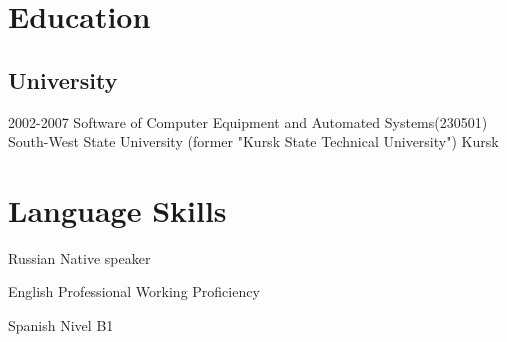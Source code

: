 \documentclass[11pt,a4paper,sans]{moderncv}
\newcommand{\lang}[2]{#2}
\begin{document}
\section
	{\lang
		{Образование}
		{Education}}

	\subsection
	{\lang
		{Высшее образование}
		{University}}

		\cventry
			{2002-2007}
			{\lang
				{Инженер по специальности «Программное обеспечение вычислительной техники и автоматизированных систем»}
				{Software of Computer Equipment and Automated Systems(230501)}}
			{\lang
				{«Юго-Западный государственный университет» (бывший «Курский государственный технический университет»)}
				{South-West State University (former "Kursk State Technical University")}}
			{\lang
				{Курск}
				{Kursk}}
			{}
			{}

	\section
	{\lang
		{Языки}
		{Language Skills}}

		\cvlanguage
		{\lang
			{Русский}
			{Russian}}
		{\lang
			{родной язык}
			{Native speaker}}
		{}

		\cvlanguage
		{\lang
			{Английский}
			{English}}
		{\lang
			{технический, разговорный}
			{Professional Working Proficiency}}
		{}

		\cvlanguage
		{\lang
			{Испанский}
			{Spanish}}
		{\lang
			{уровень B1}
			{Nivel B1}}
		{}
\end{document}
